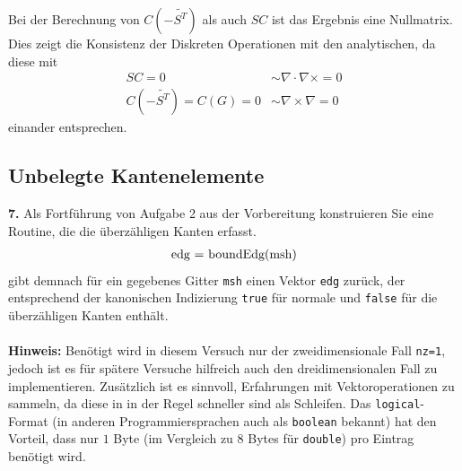 \documentclass[Protokollheft.tex]{subfiles}
\begin{document}
Bei der Berechnung von $C(-\tilde{S^T})$ als auch $SC$ ist das Ergebnis eine Nullmatrix. Dies zeigt die Konsistenz der Diskreten Operationen mit den analytischen, da diese mit
\begin{align*}
	S C = 0  &\sim  \nabla \cdot \nabla \times = 0\\
	C(-\tilde{S^T})=C(G) = 0 &\sim  \nabla \times \nabla	= 0
\end{align*}
einander entsprechen. 
{\subsection{Unbelegte Kantenelemente}}

        \begin{framed}
	\noindent \textbf{7.} Als Fortführung von Aufgabe 2 aus der Vorbereitung
                    konstruieren Sie eine Routine, die die überzähligen Kanten erfasst.
                    \begin{align}
                        \lstinline{edg = boundEdg(msh)}
                    \end{align}
                    gibt demnach für ein gegebenes Gitter \lstinline{msh} einen Vektor \lstinline{edg} zurück, der
                    entsprechend der kanonischen Indizierung \lstinline{true} für normale und \lstinline{false}
                    für die überzähligen Kanten enthält.\\
                    \ \\
                    {\textbf{Hinweis:}} Benötigt wird in diesem Versuch nur der zweidimensionale Fall \lstinline{nz=1}, jedoch ist es für spätere Versuche hilfreich auch den dreidimensionalen Fall zu implementieren. Zusätzlich ist es sinnvoll, Erfahrungen mit Vektoroperationen zu sammeln, da diese in \matlab in der Regel schneller sind als Schleifen. Das \lstinline{logical}-Format (in anderen Programmiersprachen auch als \lstinline{boolean} bekannt) hat den Vorteil, dass nur $1$ Byte (im Vergleich zu $8$ Bytes für \lstinline{double}) pro Eintrag benötigt wird.\label{exer:boundEdg}
\end{framed}
\end{document}
